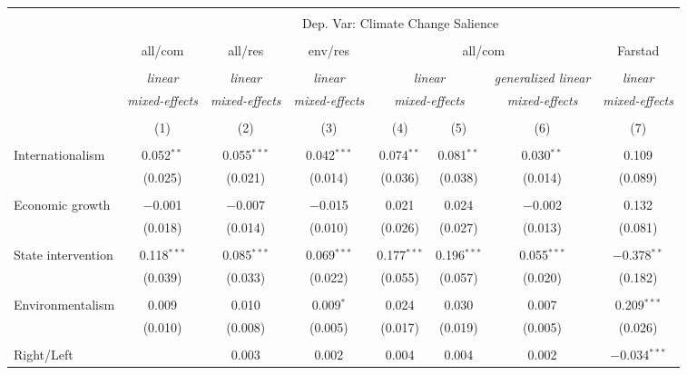 
\begin{tabular}{@{\extracolsep{5pt}}lccccccc} 
\\[-1.8ex]\hline 
\hline \\[-1.8ex] 
 & \multicolumn{7}{c}{Dep. Var: Climate Change Salience} \\ 
\cline{2-8} 
\\[-1.8ex] & all/com & all/res & env/res & \multicolumn{3}{c}{all/com} & Farstad \\ 
\\[-1.8ex] & \textit{linear} & \textit{linear} & \textit{linear} & \multicolumn{2}{c}{\textit{linear}} & \textit{generalized linear} & \textit{linear} \\ 
 & \textit{mixed-effects} & \textit{mixed-effects} & \textit{mixed-effects} & \multicolumn{2}{c}{\textit{mixed-effects}} & \textit{mixed-effects} & \textit{mixed-effects} \\ 
\\[-1.8ex] & (1) & (2) & (3) & (4) & (5) & (6) & (7)\\ 
\hline \\[-1.8ex] 
 Internationalism & 0.052$^{**}$ & 0.055$^{***}$ & 0.042$^{***}$ & 0.074$^{**}$ & 0.081$^{**}$ & 0.030$^{**}$ & 0.109 \\ 
  & (0.025) & (0.021) & (0.014) & (0.036) & (0.038) & (0.014) & (0.089) \\ 
  & & & & & & & \\ 
 Economic growth & $-$0.001 & $-$0.007 & $-$0.015 & 0.021 & 0.024 & $-$0.002 & 0.132 \\ 
  & (0.018) & (0.014) & (0.010) & (0.026) & (0.027) & (0.013) & (0.081) \\ 
  & & & & & & & \\ 
 State intervention & 0.118$^{***}$ & 0.085$^{***}$ & 0.069$^{***}$ & 0.177$^{***}$ & 0.196$^{***}$ & 0.055$^{***}$ & $-$0.378$^{**}$ \\ 
  & (0.039) & (0.033) & (0.022) & (0.055) & (0.057) & (0.020) & (0.182) \\ 
  & & & & & & & \\ 
 Environmentalism & 0.009 & 0.010 & 0.009$^{*}$ & 0.024 & 0.030 & 0.007 & 0.209$^{***}$ \\ 
  & (0.010) & (0.008) & (0.005) & (0.017) & (0.019) & (0.005) & (0.026) \\ 
  & & & & & & & \\ 
 Right/Left &  & 0.003 & 0.002 & 0.004 & 0.004 & 0.002 & $-$0.034$^{***}$ \\ 

\end{tabular}
